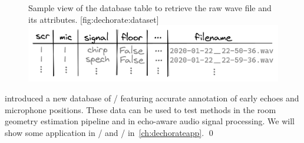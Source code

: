 \begin{figure}
    \begin{sidecaption}[]{
            Sample view of the database table to retrieve the raw wave file and its attributes.
        }[fig:dechorate:dataset]
        \centering
        \includegraphics[width=\linewidth]{figures/dechorate/database.png}
    \end{sidecaption}
\end{figure}

 introduced a new database of \RIRdef/ featuring accurate annotation of early echoes and microphone positions.
These data can be used to test methods in the room geometry estimation pipeline and in echo-aware audio signal processing.
We will show some application in \SE/ and \RooGE/ in~\cref{ch:dechorateapp}.
\qed